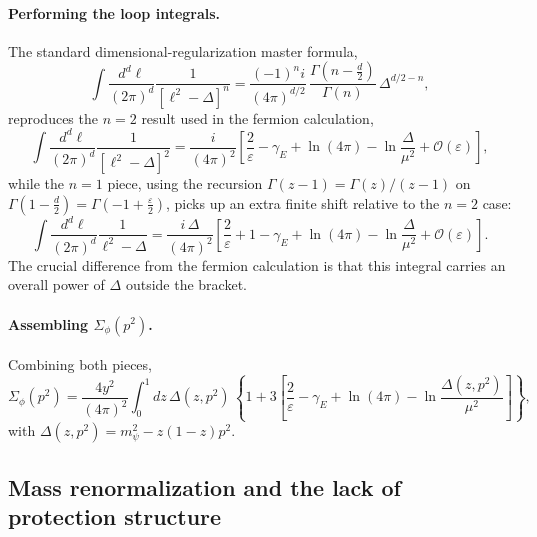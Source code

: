 \documentclass[a4paper, 11pt]{article}
\begin{document}
\paragraph{Performing the loop integrals.} The standard dimensional-regularization master formula,
\begin{equation*}
    \int\frac{d^d\ell}{(2\pi)^d}\frac{1}{[\ell^2-\Delta]^n}
    = \frac{(-1)^n i}{(4\pi)^{d/2}}\,\frac{\Gamma(n-\tfrac d2)}{\Gamma(n)}\,\Delta^{d/2-n},
\end{equation*}
reproduces the $n=2$ result used in the fermion calculation,
\begin{equation*}
    \int\frac{d^d\ell}{(2\pi)^d}\frac{1}{[\ell^2-\Delta]^2}
    = \frac{i}{(4\pi)^2}\left[\frac{2}{\varepsilon}-\gamma_E+\ln(4\pi)-\ln\frac{\Delta}{\mu^2}+\mathcal{O}(\varepsilon)\right],
\end{equation*}
while the $n=1$ piece, using the recursion $\Gamma(z-1)=\Gamma(z)/(z-1)$ on $\Gamma(1-\tfrac d2)=\Gamma(-1+\tfrac\varepsilon2)$, picks up an extra finite shift relative to the $n=2$ case:
\begin{equation*}
    \int\frac{d^d\ell}{(2\pi)^d}\frac{1}{\ell^2-\Delta}
    = \frac{i\,\Delta}{(4\pi)^2}\left[\frac{2}{\varepsilon}+1-\gamma_E+\ln(4\pi)-\ln\frac{\Delta}{\mu^2}+\mathcal{O}(\varepsilon)\right].
\end{equation*}
The crucial difference from the fermion calculation is that this integral carries an overall power of $\Delta$ outside the bracket.

\paragraph{Assembling $\Sigma_\phi(p^2)$.} Combining both pieces,
\begin{equation}
    \Sigma_\phi(p^2) = \frac{4y^2}{(4\pi)^2}\int_0^1 dz\,\Delta(z,p^2)\,
    \left\{1+3\left[\frac{2}{\varepsilon}-\gamma_E+\ln(4\pi)-\ln\frac{\Delta(z,p^2)}{\mu^2}\right]\right\},
    \label{eq:SigmaPhi_assembled}
\end{equation}
with $\Delta(z,p^2)=m_\psi^2-z(1-z)p^2$.

\subsection*{Mass renormalization and the lack of protection structure}
\end{document}
